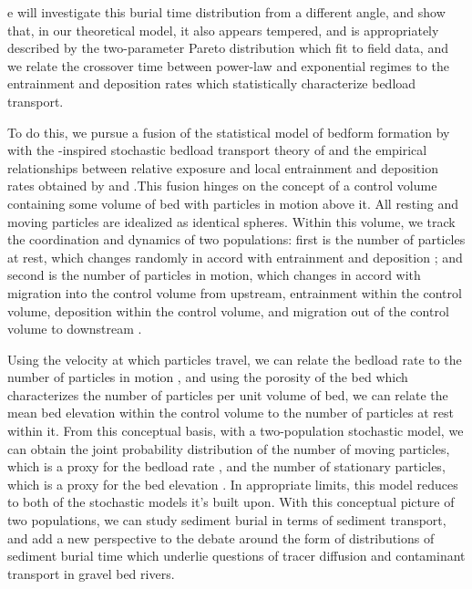 \documentclass{article}
\begin{document}
e will investigate this burial time distribution from a different angle, and show that, in our theoretical model, it also appears tempered, and is appropriately described by the two-parameter Pareto distribution which \citet{Bradley2017} fit to field data, and we relate the crossover time between power-law and exponential regimes to the entrainment and deposition rates which statistically characterize bedload transport.  




To do this, we pursue a fusion of the statistical model of bedform formation by \citet{Nakagawa1980} with the \citet{Einstein1950}-inspired stochastic bedload transport theory of \citet{Ancey2008} and the empirical relationships between relative exposure and local entrainment and deposition rates obtained by \citet{Sawai1987} and \citet{Wong2007}.This fusion hinges on the concept of a control volume containing some volume of bed with particles in motion above it. All resting and moving particles are idealized as identical spheres. Within this volume, we track the coordination and dynamics of two populations: first is the number of particles at rest, which changes randomly in accord with entrainment and deposition \citep{Nakagawa1980, Turowski2009}; and second is the number of particles in motion, which changes in accord with migration into the control volume from upstream, entrainment within the control volume, deposition within the control volume, and migration out of the control volume to downstream \citep{Ancey2008}. 

Using the velocity at which particles travel, we can relate the bedload rate to the number of particles in motion \citep{Einstein1950, Charru2004, Ancey2008, Furbish2012}, and using the porosity of the bed which characterizes the number of particles per unit volume of bed, we can relate the mean bed elevation within the control volume to the number of particles at rest within it. From this conceptual basis, with a two-population stochastic model, we can obtain the joint probability distribution of the number of moving particles, which is a proxy for the bedload rate \citep{Ancey2008}, and the number of stationary particles, which is a proxy for the bed elevation \citep{Nakagawa1980}. In appropriate limits, this model reduces to both of the stochastic models it's built upon. With this conceptual picture of two populations, we can study sediment burial in terms of sediment transport, and add a new perspective to the debate around the form of distributions of sediment burial time which underlie questions of tracer diffusion and contaminant transport in gravel bed rivers.   
\end{document}
